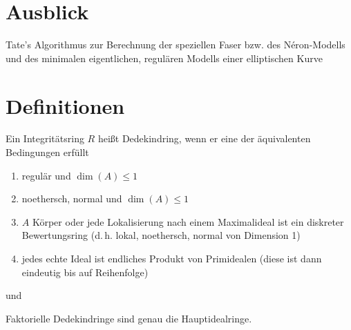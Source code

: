 \documentclass[german]{scrreprt}
\begin{document}

\chapter{Ausblick}
Tate's Algorithmus zur Berechnung der speziellen Faser bzw. des
Néron-Modells und des minimalen eigentlichen, regulären Modells einer
elliptischen Kurve
\cite[IV.9]{silverman2}


\appendix
\chapter{Definitionen}
\begin{Definition}[Dedekindring]
Ein Integritätsring $R$ heißt Dedekindring, wenn er eine der
äquivalenten Bedingungen erfüllt
\begin{enumerate}[label=(\roman*)]
\item regulär und $\dim(A)\leq 1$
\item noethersch, normal und $\dim(A)\leq 1$
\item $A$ Körper oder
  jede Lokalisierung nach einem Maximalideal ist ein diskreter
  Bewertungsring
  (d.\,h. lokal, noethersch, normal von Dimension 1)
\item jedes echte Ideal ist endliches Produkt von Primidealen
  (diese ist dann eindeutig bis auf Reihenfolge) 
\end{enumerate}
\cite[S.\,40]{hartshorne} und \cite[Definition B.84]{wedhorn}

Faktorielle Dedekindringe sind genau die Hauptidealringe.
\cite[Proposition B.85]{wedhorn}
\end{Definition}
\end{document}
